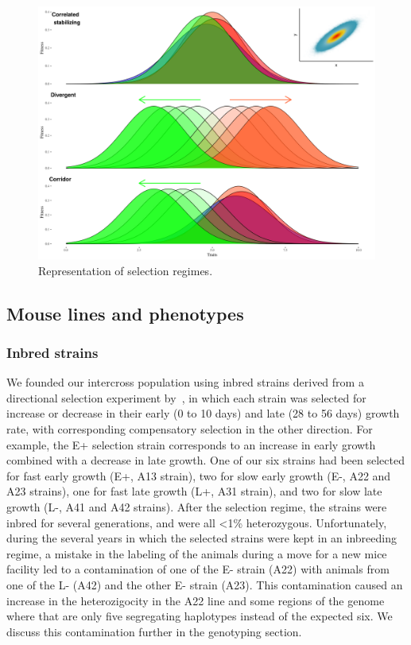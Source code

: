 \begin{refsection}
\begin{figure}
    \centering
    \includegraphics[width=\linewidth]{chapter_atchley/media/selection_types.png}
    \caption[Simulated selection regimes]{Representation of selection regimes.}
    \label{selectionregimes}
\end{figure}

\subsection{Mouse lines and phenotypes}

\subsubsection{Inbred strains} 
\label{ibs}

We founded our intercross population using inbred strains derived from a directional selection experiment by~\textcite{Atchley1997-vn}, in which each strain was selected for increase or decrease in their early (0 to 10 days) and late (28 to 56 days) growth rate, with corresponding compensatory selection in the other direction. For example, the E+ selection strain corresponds to an increase in early growth combined with a decrease in late growth. One of our six strains had been selected for fast early growth (E+, A13 strain), two for slow early growth (E-, A22 and A23 strains), one for fast late growth (L+, A31 strain), and two for slow late growth (L-, A41 and A42 strains).  After the selection regime, the strains were inbred for several generations, and were all <1\% heterozygous. Unfortunately, during the several years in which the selected strains were kept in an inbreeding regime, a mistake in the labeling of the animals during a move for a new mice facility led to a contamination of one of the E- strain (A22) with animals from one of the L- (A42) and the other E- strain (A23). This contamination caused an increase in the heterozigocity in the A22 line and some regions of the genome where that are only five segregating haplotypes instead of the expected six. We discuss this contamination further in the genotyping section. 


\end{refsection}
